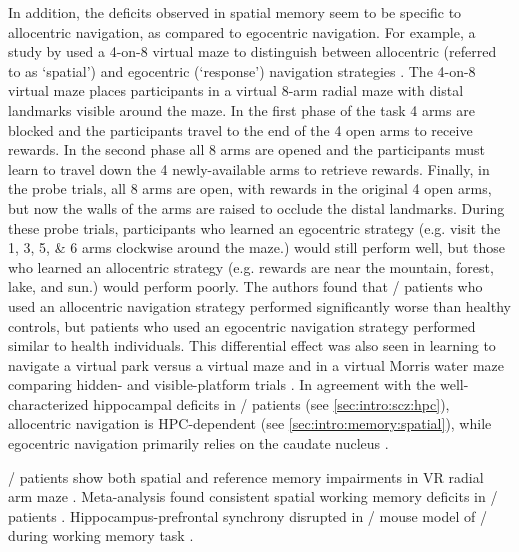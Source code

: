 In addition, the deficits observed in spatial memory seem to be specific to allocentric navigation, as compared to egocentric navigation.
For example, a study by \citeauthor{Wilkins2013} used a 4-on-8 virtual maze to distinguish between allocentric (referred to as `spatial') and egocentric (`response') navigation strategies \citep{Wilkins2013}.
The 4-on-8 virtual maze places participants in a virtual 8-arm radial maze with distal landmarks visible around the maze.
In the first phase of the task 4 arms are blocked and the participants travel to the end of the 4 open arms to receive rewards.
In the second phase all 8 arms are opened and the participants must learn to travel down the 4 newly-available arms to retrieve rewards.
Finally, in the probe trials, all 8 arms are open, with rewards in the original 4 open arms, but now the walls of the arms are raised to occlude the distal landmarks.
During these probe trials, participants who learned an egocentric strategy (e.g. visit the 1, 3, 5, \& 6 arms clockwise around the maze.) would still perform well, but those who learned an allocentric strategy (e.g. rewards are near the mountain, forest, lake, and sun.) would perform poorly.
The authors found that \scz/ patients who used an allocentric navigation strategy performed significantly worse than healthy controls, but patients who used an egocentric navigation strategy performed similar to health individuals.
This differential effect was also seen in learning to navigate a virtual park versus a virtual maze \citep{Weniger2008} and in a virtual Morris water maze comparing hidden- and visible-platform trials \citep{Hanlon2006}.
In agreement with the well-characterized hippocampal deficits in \scz/ patients (see \autoref{sec:intro:scz:hpc}), allocentric navigation is \acs{HPC}-dependent (see \autoref{sec:intro:memory:spatial}), while egocentric navigation primarily relies on the caudate nucleus \citep{Hartley2003}.

\Scz/ patients show both spatial and reference memory impairments in VR radial arm maze \citep{Spieker2012}.
Meta-analysis found consistent spatial working memory deficits in \scz/ patients \citep{Piskulic2007}.
Hippocampus-prefrontal synchrony disrupted in \df/ mouse model of \scz/ during working memory task \citep{Sigurdsson2010}. 



